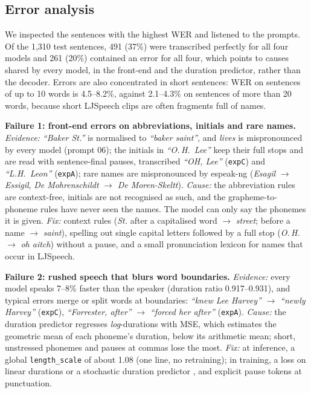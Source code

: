 \documentclass[11pt,a4paper]{article}
\newcommand{\expA}{\texttt{expA}}
\newcommand{\expC}{\texttt{expC}}
\begin{document}
\subsection{Error analysis}\label{sec:errors}
We inspected the sentences with the highest WER and listened to the prompts. Of the 1{,}310 test sentences, 491 (37\%) were transcribed perfectly for all four models and 261 (20\%) contained an error for all four, which points to causes shared by every model, in the front-end and the duration predictor, rather than the decoder. Errors are also concentrated in short sentences: WER on sentences of up to 10 words is 4.5--8.2\%, against 2.1--4.3\% on sentences of more than 20 words, because short LJSpeech clips are often fragments full of names.

\noindent\textbf{Failure 1: front-end errors on abbreviations, initials and rare names.} \emph{Evidence:} \textit{``Baker St.''} is normalised to \textit{``baker saint''}, and \textit{lives} is mispronounced by every model (prompt 06); the initials in \textit{``O.\,H.\ Lee''} keep their full stops and are read with sentence-final pauses, transcribed \textit{``OH, Lee''} (\expC) and \textit{``L.H.\ Leon''} (\expA); rare names are mispronounced by espeak-ng (\textit{Esagil} $\rightarrow$ \textit{Essigil}, \textit{De Mohrenschildt} $\rightarrow$ \textit{De Moren-Skeltt}). \emph{Cause:} the abbreviation rules are context-free, initials are not recognised as such, and the grapheme-to-phoneme rules have never seen the names. The model can only say the phonemes it is given. \emph{Fix:} context rules (\textit{St.} after a capitalised word $\rightarrow$ \textit{street}; before a name $\rightarrow$ \textit{saint}), spelling out single capital letters followed by a full stop (\textit{O.\,H.} $\rightarrow$ \textit{oh aitch}) without a pause, and a small pronunciation lexicon for names that occur in LJSpeech.

\noindent\textbf{Failure 2: rushed speech that blurs word boundaries.} \emph{Evidence:} every model speaks 7--8\% faster than the speaker (duration ratio 0.917--0.931), and typical errors merge or split words at boundaries: \textit{``knew Lee Harvey''} $\rightarrow$ \textit{``newly Harvey''} (\expC), \textit{``Forrester, after''} $\rightarrow$ \textit{``forced her after''} (\expA). \emph{Cause:} the duration predictor regresses \emph{log}-durations with MSE, which estimates the geometric mean of each phoneme's duration, below its arithmetic mean; short, unstressed phonemes and pauses at commas lose the most. \emph{Fix:} at inference, a global \texttt{length\_scale} of about 1.08 (one line, no retraining); in training, a loss on linear durations or a stochastic duration predictor \citep{kim2021vits}, and explicit pause tokens at punctuation.
\end{document}
